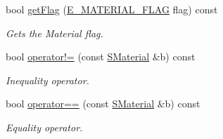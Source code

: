 \begin{DoxyCompactItemize}
bool \hyperlink{classirr_1_1video_1_1SMaterial_a3811e59a69983b4a7fce2d8e7aaf91f1}{get\+Flag} (\hyperlink{namespaceirr_1_1video_a8a3bc00ae8137535b9fbc5f40add70d3}{E\+\_\+\+M\+A\+T\+E\+R\+I\+A\+L\+\_\+\+F\+L\+AG} flag) const
\begin{DoxyCompactList}\small\item\em Gets the Material flag. \end{DoxyCompactList}\item 
bool \hyperlink{classirr_1_1video_1_1SMaterial_aeb4cd5880d7fbf330dc4d5cca0177407}{operator!=} (const \hyperlink{classirr_1_1video_1_1SMaterial}{S\+Material} \&b) const
\begin{DoxyCompactList}\small\item\em Inequality operator. \end{DoxyCompactList}\item 
bool \hyperlink{classirr_1_1video_1_1SMaterial_a32066f6f8ee564be1cabc73de1d0cb6a}{operator==} (const \hyperlink{classirr_1_1video_1_1SMaterial}{S\+Material} \&b) const
\begin{DoxyCompactList}\small\item\em Equality operator. \end{DoxyCompactList}\end{DoxyCompactItemize}
